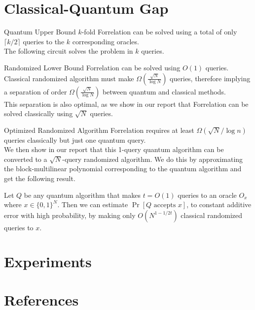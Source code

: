 \documentclass[10pt]{beamer}
\begin{document}
\section{Classical-Quantum Gap}

\begin{frame}{Quantum Upper Bound}
   $k$-fold Forrelation can be solved using a total of only $\lceil k/2 \rceil$ queries to the $k$ corresponding oracles.\\
  The following circuit solves the problem in $k$ queries.
  
\end{frame}

\begin{frame}{Randomized Lower Bound}
 Forrelation can be solved using $O(1)$ queries. \\
 Classical randomized algorithm must make $\Omega(\frac{\sqrt{N}}{\log N})$ queries, therefore implying a separation of order $\Omega(\frac{\sqrt{N}}{\log N})$ between quantum and classical methods.\\
  This separation is also optimal, as we show in our report that Forrelation can be solved classically using $\sqrt{N}$ queries.    
\end{frame}

\begin{frame}{Optimized Randomized Algorithm}
Forrelation requires at least $\Omega(\sqrt{N}/\log n)$ queries classically but just one quantum query. \\
We then show in our report that this 1-query quantum algorithm can be converted to a $\sqrt{N}$-query randomized algorithm. We do this by approximating the block-multilinear polynomial corresponding to the quantum algorithm and get the following result.

Let $Q$ be any quantum algorithm that makes $t = O(1)$ queries to an oracle $O_x$ where $x \in \{0,1\}^{N}$. Then we can estimate $\Pr[Q\text{ accepts }x]$, to constant additive error with high probability, by making only $O\left(N^{1 - 1/2t}\right)$ classical randomized queries to $x$.
\end{frame}
\section{Experiments}
\section{References}
\end{document}
